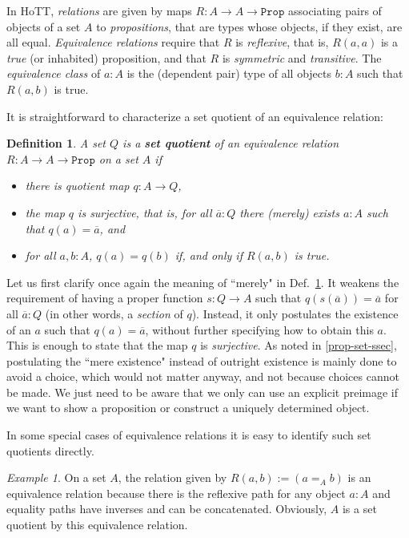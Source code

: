 \documentclass{amsart}
\theoremstyle{plain}
\numberwithin{equation}{section} %
\numberwithin{figure}{section} %
\theoremstyle{plain}
\theoremstyle{plain}
\theoremstyle{plain}
\theoremstyle{plain}
\theoremstyle{plain}
\theoremstyle{plain}
\newtheorem{Def}[thm]{Definition} %
\theoremstyle{remark}
\theoremstyle{remark}
\theoremstyle{remark}
\newtheorem{exm}[thm]{Example}
\begin{document}
In HoTT, \textit{relations} are given by maps $R : A \rightarrow A \rightarrow \mathtt{Prop}$ associating pairs of objects of a set $A$ to \textit{propositions}, that are types whose objects, if they exist, are all equal. \textit{Equivalence relations} require that $R$ is \textit{reflexive}, that is,  $R(a,a)$ is a \textit{true} (or inhabited) proposition, and that $R$ is \textit{symmetric} and \textit{transitive}. The \textit{equivalence class} of $a : A$ is the (dependent pair) type of all objects $b : A$ such that $R(a, b)$ is true. 

It is straightforward to characterize a set quotient of an equivalence relation:
\begin{Def} \label{set-quot-def}  %
A set $Q$ is a \textbf{set quotient} of an equivalence relation $R : A \rightarrow A \rightarrow \mathtt{Prop}$ on a set $A$ if
\begin{itemize}
\item[(i)] there is \textit{quotient map} $q : A \rightarrow Q$, 
\item[(ii)] the map $q$ is surjective, that is, for all $\overline{a} : Q$ there (merely) exists $a : A$ such that $q(a) = \overline{a}$, and
\item[(iii)] for all $a, b : A$, $q(a) = q(b)$ if, and only if $R(a, b)$ is true. 
\end{itemize}
\end{Def}

Let us first clarify once again the meaning of ``merely" in Def.~\ref{set-quot-def}. It weakens the requirement of having a proper function $s : Q \rightarrow A$ such that $q(s(\overline{a})) = \overline{a}$ for all $\overline{a} : Q$ (in other words, a \textit{section} of $q$). Instead, it only postulates the existence of an $a$ such that $q(a) = \overline{a}$, without further specifying how to obtain this $a$. This is enough to state that the map $q$ is \textit{surjective}. As noted in \ref{prop-set-ssec}, postulating the ``mere existence" instead of outright existence is mainly done to avoid a choice, which would not matter anyway, and not because choices cannot be made. We just need to be aware that we only can use an explicit preimage if we want to show a proposition or construct a uniquely determined object.

In some special cases of equivalence relations it is easy to identify such set quotients directly.
\begin{exm}  %
On a set $A$, the relation given by $R(a, b) := (a =_A b)$ is an equivalence relation because there is the reflexive path for any object $a : A$ and equality paths have inverses and can be concatenated. Obviously, $A$ is a set quotient by this equivalence relation. 
\end{exm} 
\end{document}
